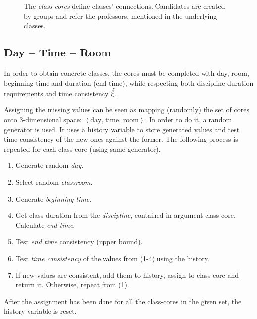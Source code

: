 \documentclass[../../ThesisDoc]{subfiles}
\begin{document}

\begin{figure}[h]
  \centering
  
  \caption{The \emph{class cores} define classes' connections. Candidates are
           created by groups and refer the professors, mentioned in the
           underlying classes. }
  \label{fig:class-cores}
\end{figure}

\subsection{Day -- Time -- Room}
\label{sec:solution-DTR}

In order to obtain concrete classes, the cores must be completed with day, room,
beginning time and duration (end time), while respecting both discipline duration
requirements and time consistency $\accentset{T}{\xi}$.

Assigning the missing values can be seen as mapping (randomly) the set of cores onto
3-dimensional space: $\left< \text{day, time, room} \right>$.
In order to do it, a random generator is used. It uses a history variable to
store generated values and test time consistency of the new ones against the former.
The following process is repeated for each class core (using same generator).
\begin{enumerate}
  \item Generate random \emph{day}.
  \item Select random \emph{classroom}.
  \item Generate \emph{beginning time}.
  \item Get class duration from the \emph{discipline}, contained in argument class-core.
        Calculate \emph{end time}.
  \item Test \emph{end time} consistency (upper bound).
  \item Test \emph{time consistency} of the values from (1-4) using the history.
  \item If new values are consistent, add them to history, assign to class-core
        and return it.
        Otherwise, repeat from (1).

\end{enumerate}
After the assignment has been done for all the class-cores in the given set,
the history variable is reset.
\end{document}
